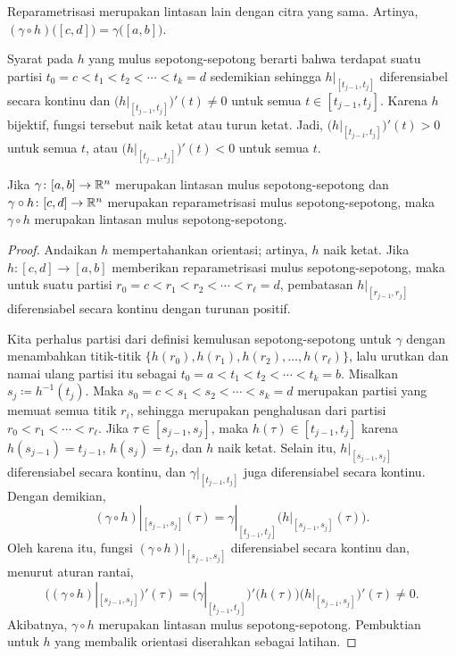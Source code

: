 Reparametrisasi merupakan lintasan lain dengan citra yang sama.  Artinya,
$(\gamma \circ h)\bigl([c,d]\bigr) =
\gamma \bigl([a,b]\bigr)$.

Syarat pada $h$ yang mulus sepotong-sepotong berarti bahwa
terdapat suatu partisi $t_0 = c < t_1 < t_2 < \cdots < t_k = d$
sedemikian sehingga $h|_{[t_{j-1},t_j]}$ diferensiabel secara kontinu
dan $\bigl(h|_{[t_{j-1},t_j]}\bigr)'(t) \neq 0$
untuk semua $t \in [t_{j-1},t_j]$.
Karena $h$ bijektif, fungsi tersebut naik ketat atau
turun ketat.  Jadi, $\bigl(h|_{[t_{j-1},t_j]}\bigr)'(t) > 0$
untuk semua $t$, atau $\bigl(h|_{[t_{j-1},t_j]}\bigr)'(t) < 0$ untuk semua $t$.

\begin{prop} \label{prop:reparamapiecewisesmooth}
Jika $\gamma \colon [a,b] \to {\mathbb{R}}^n$ merupakan lintasan mulus sepotong-sepotong
dan $\gamma \circ h \colon [c,d] \to {\mathbb{R}}^n$ merupakan
reparametrisasi mulus sepotong-sepotong, maka $\gamma \circ h$
merupakan lintasan mulus sepotong-sepotong.
\end{prop}

\begin{proof}
Andaikan $h$ mempertahankan orientasi; artinya, $h$ naik ketat.
Jika $h \colon [c,d] \to [a,b]$ memberikan reparametrisasi mulus sepotong-sepotong,
maka untuk suatu partisi
$r_0 = c < r_1 < r_2 < \cdots < r_\ell = d$, pembatasan
$h|_{[r_{j-1},r_j]}$ diferensiabel secara kontinu dengan turunan
positif.

Kita perhalus partisi dari definisi kemulusan sepotong-sepotong untuk $\gamma$
dengan menambahkan titik-titik
$\{ h(r_0), h(r_1), h(r_2), \ldots, h(r_\ell) \}$, lalu urutkan dan namai ulang
partisi itu sebagai $t_0 = a < t_1 < t_2 < \cdots < t_k = b$.
Misalkan $s_j \coloneqq h^{-1}(t_j)$.  Maka
$s_0 = c < s_1 < s_2 < \cdots < s_k = d$
merupakan partisi yang memuat semua titik $r_i$, sehingga merupakan penghalusan
dari partisi $r_0 < r_1 < \cdots < r_\ell$.
Jika $\tau \in [s_{j-1},s_j]$, maka $h(\tau) \in [t_{j-1},t_j]$
karena $h(s_{j-1}) = t_{j-1}$,
$h(s_{j}) = t_j$, dan
$h$ naik ketat.
Selain itu, $h|_{[s_{j-1},s_j]}$ diferensiabel secara kontinu, dan
$\gamma|_{[t_{j-1},t_j]}$ juga diferensiabel secara kontinu.
Dengan demikian,
\begin{equation*}
(\gamma \circ h)|_{[s_{j-1},s_{j}]} (\tau)
=
\gamma|_{[t_{j-1},t_{j}]} \bigl( h|_{[s_{j-1},s_j]}(\tau) \bigr) .
\end{equation*}
Oleh karena itu, fungsi 
$(\gamma \circ h)|_{[s_{j-1},s_{j}]}$
diferensiabel secara kontinu dan, menurut aturan rantai,
\begin{equation*}
\bigl( (\gamma \circ h)|_{[s_{j-1},s_{j}]} \bigr) ' (\tau)
=
\bigl( \gamma|_{[t_{j-1},t_{j}]} \bigr)' \bigl( h(\tau) \bigr)
\bigl(h|_{[s_{j-1},s_j]}\bigr)'(\tau) \neq 0 .
\end{equation*}
Akibatnya, $\gamma \circ h$ merupakan lintasan mulus sepotong-sepotong.
Pembuktian untuk $h$ yang membalik orientasi diserahkan sebagai latihan.
\end{proof}

